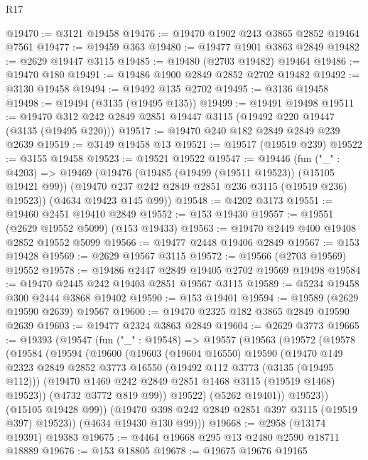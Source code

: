 \begin{lexlean}{R17}
\begin{coremodule}
@19470 := @3121 @19458
@19476 := @19470 @1902 @243 @3865 @2852 @19464 @7561
@19477 := @19459 @363
@19480 := @19477 @1901 @3863 @2849
@19482 := @2629 @19447 @3115
@19485 := @19480 (@2703 @19482) @19464
@19486 := @19470 @180
@19491 := @19486 @1900 @2849 @2852 @2702 @19482
@19492 := @3130 @19458
@19494 := @19492 @135 @2702
@19495 := @3136 @19458
@19498 := @19494 (@3135 (@19495 @135))
@19499 := @19491 @19498
@19511 := @19470 @312 @242 @2849 @2851 @19447 @3115 (@19492 @220 @19447 (@3135 (@19495 @220)))
@19517 := @19470 @240 @182 @2849 @2849 @239 @2639
@19519 := @3149 @19458 @13
@19521 := @19517 (@19519 @239)
@19522 := @3155 @19458
@19523 := @19521 @19522
@19547 := @19446
    (fun ("_" : @4203) =>
    @19469
      (@19476
        (@19485 (@19499 (@19511 @19523)) (@15105 @19421 @99))
        (@19470 @237 @242 @2849 @2851 @236 @3115 (@19519 @236) @19523))
      (@4634 @19423 @145 @99))
@19548 := @4202 @3173
@19551 := @19460 @2451 @19410 @2849
@19552 := @153 @19430
@19557 := @19551 (@2629 @19552 @5099) (@153 @19433)
@19563 := @19470 @2449 @400 @19408 @2852 @19552 @5099
@19566 := @19477 @2448 @19406 @2849
@19567 := @153 @19428
@19569 := @2629 @19567 @3115
@19572 := @19566 (@2703 @19569) @19552
@19578 := @19486 @2447 @2849 @19405 @2702 @19569 @19498
@19584 := @19470 @2445 @242 @19403 @2851 @19567 @3115
@19589 := @5234 @19458 @300 @2444 @3868 @19402
@19590 := @153 @19401
@19594 := @19589 (@2629 @19590 @2639) @19567
@19600 := @19470 @2325 @182 @3865 @2849 @19590 @2639
@19603 := @19477 @2324 @3863 @2849
@19604 := @2629 @3773
@19665 := @19393
    (@19547
      (fun ("_" : @19548) =>
      @19557
        (@19563
          (@19572
            (@19578
              (@19584
                (@19594
                  (@19600
                    (@19603
                      (@19604 @16550)
                      @19590
                      (@19470
                        @149
                        @2323
                        @2849
                        @2852
                        @3773
                        @16550
                        (@19492 @112 @3773 (@3135 (@19495 @112)))
                        (@19470 @1469 @242 @2849 @2851 @1468 @3115 (@19519 @1468) @19523))
                      (@4732 @3772 @819 @99))
                    @19522)
                  (@5262 @19401))
                @19523))
            (@15105 @19428 @99))
          (@19470 @398 @242 @2849 @2851 @397 @3115 (@19519 @397) @19523))
        (@4634 @19430 @130 @99)))
@19668 := @2958 (@13174 @19391) @19383
@19675 := @4464 @19668 @295 @13 @2480 @2590 @18711 @18889
@19676 := @153 @18805
@19678 := @19675 @19676 @19165

\end{coremodule}
\end{lexlean}
